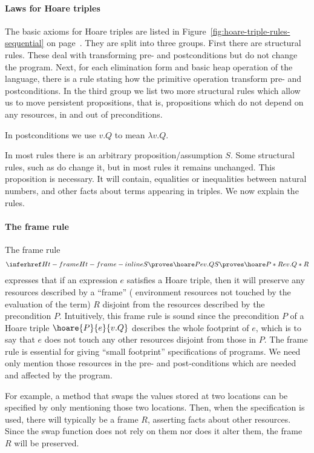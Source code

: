 \paragraph{Laws for Hoare triples}
The basic axioms for Hoare triples are listed in Figure~\ref{fig:hoare-triple-rules-sequential} on page~\pageref{fig:hoare-triple-rules-sequential}.
They are split into three groups.
First there are structural rules.
These deal with transforming pre- and postconditions but do not change the program.
Next, for each elimination form and basic heap operation of the language, there is a rule stating how the primitive operation transform pre- and postconditions.
In the third group we list two more structural rules which allow us to move persistent propositions, that is, propositions which do not depend on any resources, in and out of preconditions.

In postconditions we use $v.Q$ to mean $\lambda v.Q$.

In most rules there is an arbitrary proposition/assumption $S$.
Some structural rules, such as  do change it, but in most rules it remains unchanged.
This proposition is necessary.
It will contain, \eg{} equalities or inequalities between natural numbers, and other facts about terms appearing in triples.
We now explain the rules.

\paragraph{The frame rule}
The frame rule
\begin{align*}
\htframe[-inline]
\end{align*}
expresses that if an expression $e$ satisfies a Hoare triple, then it
will preserve any resources described by a ``frame'' (\ie{}
environment resources not touched by the evaluation of the term) $R$
disjoint from the resources described by the precondition $P$.
Intuitively, this frame rule is sound since the precondition $P$ of a
Hoare triple $\hoare{P}{e}{v.Q}$ describes the whole footprint of $e$,
which is to say that $e$ does not touch any other resources disjoint
from those in $P$.
The frame rule is essential for giving ``small footprint'' specifications of programs.
We need only mention those resources in the pre- and post-conditions which are needed and affected by the program.

For example, a method that swaps the values stored at two locations can be
specified by only mentioning those two locations.  Then, when the
specification is used, there will typically be a frame $R$, asserting
facts about other resources.  Since the swap function does
not rely on them nor does it alter them, the frame $R$ will be
preserved.


